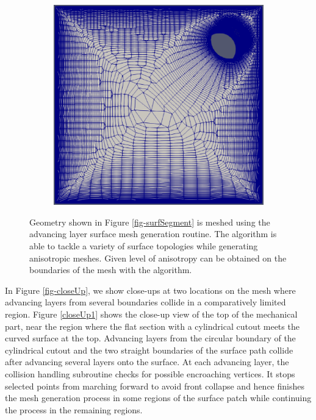 \begin{figure}[hbt!]
\begin{subfigure}{0.33\textwidth}
		\includegraphics[width=0.9\linewidth]{img/r/joint-x0.004-g1.04-a5/bottom.eps}
		\caption{}
		\label{fig-joint-bottom}
	\end{subfigure}
	\caption[EDAMSurf mesh of a mechanical part (robustness test case 2).]{Geometry shown in Figure \ref{fig-surfSegment} is meshed using the advancing layer surface mesh generation routine. The algorithm is able to tackle a variety of surface topologies while generating anisotropic meshes. Given level of anisotropy can be obtained on the boundaries of the mesh with the algorithm.}
	\label{fig-joint}
\end{figure}

In Figure \ref{fig-closeUp}, we show close-ups at two locations on the mesh where advancing layers from several boundaries collide in a comparatively limited region. Figure \ref{closeUp1} shows the close-up view of the top of the mechanical part, near the region where the flat section with a cylindrical cutout meets the curved surface at the top. Advancing layers from the circular boundary of the cylindrical cutout and the two straight boundaries of the surface path collide after advancing several layers onto the surface. At each advancing layer, the collision handling subroutine checks for possible encroaching vertices. It stops selected points from marching forward to avoid front collapse and hence finishes the mesh generation process in some regions of the surface patch while continuing the process in the remaining regions.

